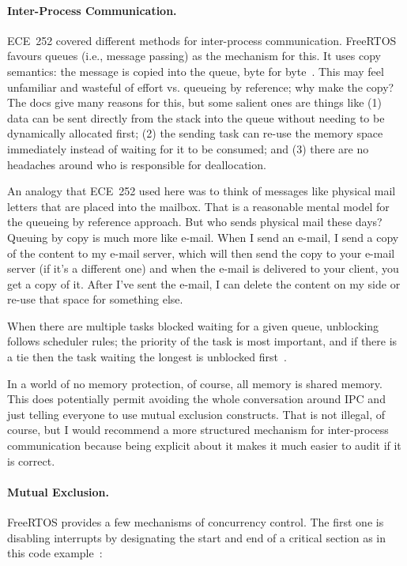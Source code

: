 \paragraph{Inter-Process Communication.} 
ECE~252 covered different methods for inter-process communication. FreeRTOS favours queues (i.e., message passing) as the mechanism for this. It uses copy semantics: the message is copied into the queue, byte for byte~\cite{freertos}. This may feel unfamiliar and wasteful of effort vs. queueing by reference; why make the copy? The docs give many reasons for this, but some salient ones are things like (1) data can be sent directly from the stack into the queue without needing to be dynamically allocated first; (2) the sending task can re-use the memory space immediately instead of waiting for it to be consumed; and (3) there are no headaches around who is responsible for deallocation.

An analogy that ECE~252 used here was to think of messages like physical mail letters that are placed into the mailbox. That is a reasonable mental model for the queueing by reference approach. But who sends physical mail these days? Queuing by copy is much more like e-mail. When I send an e-mail, I send a copy of the content to my e-mail server, which will then send the copy to your e-mail server (if it's a different one) and when the e-mail is delivered to your client, you get a copy of it. After I've sent the e-mail, I can delete the content on my side or re-use that space for something else.

When there are multiple tasks blocked waiting for a given queue, unblocking follows scheduler rules; the priority of the task is most important, and if there is a tie then the task waiting the longest is unblocked first~\cite{freertos}.

In a world of no memory protection, of course, all memory is shared memory. This does potentially permit avoiding the whole conversation around IPC and just telling everyone to use mutual exclusion constructs. That is not illegal, of course, but I would recommend a more structured mechanism for inter-process communication because being explicit about it makes it much easier to audit if it is correct.

\paragraph{Mutual Exclusion.}
FreeRTOS provides a few mechanisms of concurrency control. The first one is disabling interrupts by designating the start and end of a critical section as in this code example~\cite{freertos}: 

